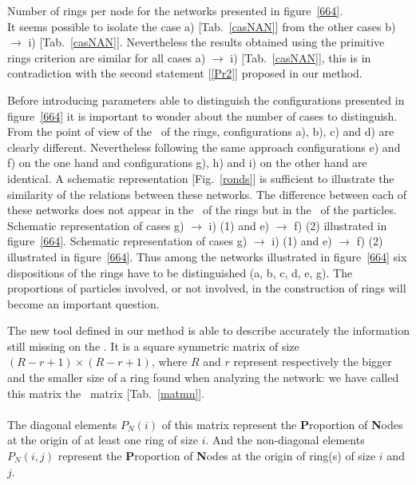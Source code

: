 {Number of rings per node for the networks presented in figure~\ref{664}.}
\\It seems possible to isolate the case a) [Tab.~\ref{casNAN}] from the other cases b) $\to$ i) [Tab.~\ref{casNAN}]. 
Nevertheless the results obtained using the primitive rings criterion are similar for all cases a) $\to$ i) [Tab.~\ref{casNAN}], this is in contradiction with the second statement [\ref{Pr2}] proposed in our method. \\
\par
Before introducing parameters able to distinguish the configurations presented in figure~\ref{664} it is important to wonder about the number of cases to distinguish. 
From the point of view of the \con\ of the rings, configurations a), b), c) and d) are clearly different. 
Nevertheless following the same approach configurations e) and f) on the one hand and configurations g), h) and i) on the other hand are identical. 
A schematic representation [Fig.~\ref{ronds}] is sufficient to illustrate the similarity of the relations between these networks. 
The difference between each of these networks does not appear in the \con\ of the rings but in the \con\ of the particles. \\
{Schematic representation of cases g) $\to$ i) (1) and e) $\to$ f) (2) illustrated in figure~\ref{664}.}
{Schematic representation of cases g) $\to$ i) (1) and e) $\to$ f) (2) illustrated in figure~\ref{664}.}
\laf Thus among the networks illustrated in figure~\ref{664} six dispositions of the rings have to be distinguished (a, b, c, d, e, g). 
The proportions of particles involved, or not involved, in the construction of rings will become an important question. \\
\par
The new tool defined in our method is able to describe accurately the information still missing on the \con. 
It is a square symmetric matrix of size $(R-r+1)\times (R-r+1)$, where $R$ and $r$ represent respectively the bigger and the smaller size of a ring found when analyzing the network: we have called this matrix the \con\ matrix [Tab.~\ref{matmn}]. \\ 
\gmatrix
\\The diagonal elements $P_N(i)$ of this matrix represent the {\bf{P}}roportion of {\bf{N}}odes at the origin of at least one ring of size $i$. 
And the non-diagonal elements $P_N(i,j)$ represent the {\bf{P}}roportion of {\bf{N}}odes at the origin of ring(s) of size $i$ and $j$. \\ 
